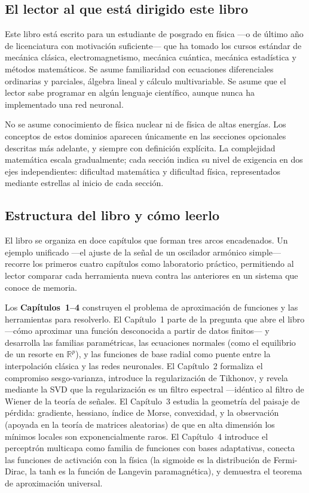 \subsection*{El lector al que está dirigido este libro}

Este libro está escrito para un estudiante de posgrado en física ---o de
último año de licenciatura con motivación suficiente--- que ha tomado los
cursos estándar de mecánica clásica, electromagnetismo, mecánica cuántica,
mecánica estadística y métodos matemáticos. Se asume familiaridad con
ecuaciones diferenciales ordinarias y parciales, álgebra lineal y cálculo
multivariable. Se asume que el lector sabe programar en algún lenguaje
científico, aunque nunca ha implementado una red neuronal.

No se asume conocimiento de física nuclear ni de física de altas energías.
Los conceptos de estos dominios aparecen únicamente en las secciones
opcionales descritas más adelante, y siempre con definición explícita.
La complejidad matemática escala gradualmente; cada sección indica su
nivel de exigencia en dos ejes independientes: dificultad matemática y
dificultad física, representados mediante estrellas al inicio de cada
sección.

\subsection*{Estructura del libro y cómo leerlo}

El libro se organiza en doce capítulos que forman tres arcos encadenados.
Un ejemplo unificado ---el ajuste de la señal de un oscilador armónico
simple--- recorre los primeros cuatro capítulos como laboratorio práctico,
permitiendo al lector comparar cada herramienta nueva contra las anteriores
en un sistema que conoce de memoria.

Los \textbf{Capítulos~1--4} construyen el problema de aproximación de
funciones y las herramientas para resolverlo. El Capítulo~1 parte de la
pregunta que abre el libro ---cómo aproximar una función desconocida a
partir de datos finitos--- y desarrolla las familias paramétricas, las
ecuaciones normales (como el equilibrio de un resorte en $\mathbb{R}^p$),
y las funciones de base radial como puente entre la interpolación clásica
y las redes neuronales. El Capítulo~2 formaliza el compromiso
sesgo-varianza, introduce la regularización de Tikhonov, y revela mediante
la SVD que la regularización es un filtro espectral ---idéntico al filtro de
Wiener de la teoría de señales. El Capítulo~3 estudia la geometría del
paisaje de pérdida: gradiente, hessiano, índice de Morse, convexidad, y la
observación (apoyada en la teoría de matrices aleatorias) de que en alta
dimensión los mínimos locales son exponencialmente raros. El Capítulo~4
introduce el perceptrón multicapa como familia de funciones con bases
adaptativas, conecta las funciones de activación con la física
(la sigmoide es la distribución de Fermi-Dirac, la tanh es la función de
Langevin paramagnética), y demuestra el teorema de aproximación universal.

